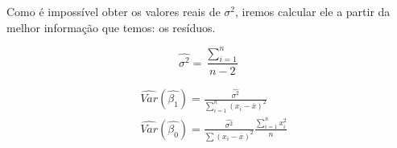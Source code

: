 \documentclass[12pt,a4paper,oneside,brazil]{abntex2}
\begin{document}
Como é impossível obter os valores reais de $\sigma^2$, iremos calcular ele a partir da melhor informação que temos: os resíduos.

\begin{equation}
   \hat{\sigma^2} = \frac{\sum^{n}_{i = 1}}{n - 2}
 \end{equation} 

\begin{align}
& \hat{Var} (\hat{\beta_1}) = \frac{\hat{\sigma^2}}{\sum^{n}_{i = 1} (x_i - \overline{x})^2} \\
& \hat{Var}(\hat{\beta_0}) = \frac{\hat{\sigma^2}}{\sum (x_i - \overline{x})^2} \frac{\sum^{n}_{i = 1} x_i^2}{n}
\end{align}

\printbibliography
\end{document}
